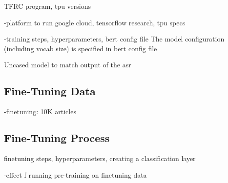TFRC program, tpu versions
 
-platform to run google cloud, tensorflow research, tpu specs

-training steps, hyperparameters, bert config file
The model configuration (including vocab size) is specified in bert config file






 Uncased model to match output of the asr
 

\subsection{Fine-Tuning Data}
 -finetuning: 10K articles
 
\subsection{Fine-Tuning Process}
 finetuning steps, hyperparameters,
 creating a classification layer

-effect f running pre-training on finetuning data


